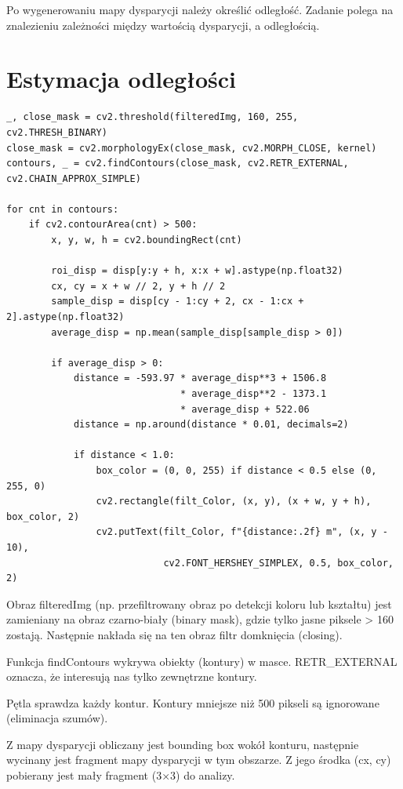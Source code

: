 \documentclass[magisterska]{pracadypl}
\begin{document}
Po wygenerowaniu mapy dysparycji należy określić odległość. Zadanie polega na znalezieniu zależności między wartością dysparycji, a odległością.

\section{Estymacja odległości}

\begin{lstlisting}[style=mypython]
_, close_mask = cv2.threshold(filteredImg, 160, 255, cv2.THRESH_BINARY)
close_mask = cv2.morphologyEx(close_mask, cv2.MORPH_CLOSE, kernel)
contours, _ = cv2.findContours(close_mask, cv2.RETR_EXTERNAL, cv2.CHAIN_APPROX_SIMPLE)

for cnt in contours:
    if cv2.contourArea(cnt) > 500:
        x, y, w, h = cv2.boundingRect(cnt)

        roi_disp = disp[y:y + h, x:x + w].astype(np.float32)
        cx, cy = x + w // 2, y + h // 2
        sample_disp = disp[cy - 1:cy + 2, cx - 1:cx + 2].astype(np.float32)
        average_disp = np.mean(sample_disp[sample_disp > 0])

        if average_disp > 0:
            distance = -593.97 * average_disp**3 + 1506.8 
                               * average_disp**2 - 1373.1 
                               * average_disp + 522.06
            distance = np.around(distance * 0.01, decimals=2)

            if distance < 1.0:
                box_color = (0, 0, 255) if distance < 0.5 else (0, 255, 0)
                cv2.rectangle(filt_Color, (x, y), (x + w, y + h), box_color, 2)
                cv2.putText(filt_Color, f"{distance:.2f} m", (x, y - 10),
                            cv2.FONT_HERSHEY_SIMPLEX, 0.5, box_color, 2)
\end{lstlisting}

Obraz filteredImg (np. przefiltrowany obraz po detekcji koloru lub kształtu) jest zamieniany na obraz czarno-biały (binary mask), gdzie tylko jasne piksele > 160 zostają. Następnie nakłada się na ten obraz filtr domknięcia (closing).

Funkcja findContours wykrywa obiekty (kontury) w masce. RETR\_EXTERNAL oznacza, że interesują nas tylko zewnętrzne kontury.

Pętla sprawdza każdy kontur. Kontury mniejsze niż 500 pikseli są ignorowane (eliminacja szumów).

Z mapy dysparycji obliczany jest bounding box wokół konturu, następnie wycinany jest fragment mapy dysparycji w tym obszarze. Z jego środka (cx, cy) pobierany jest mały fragment (3×3) do analizy.
\end{document}
